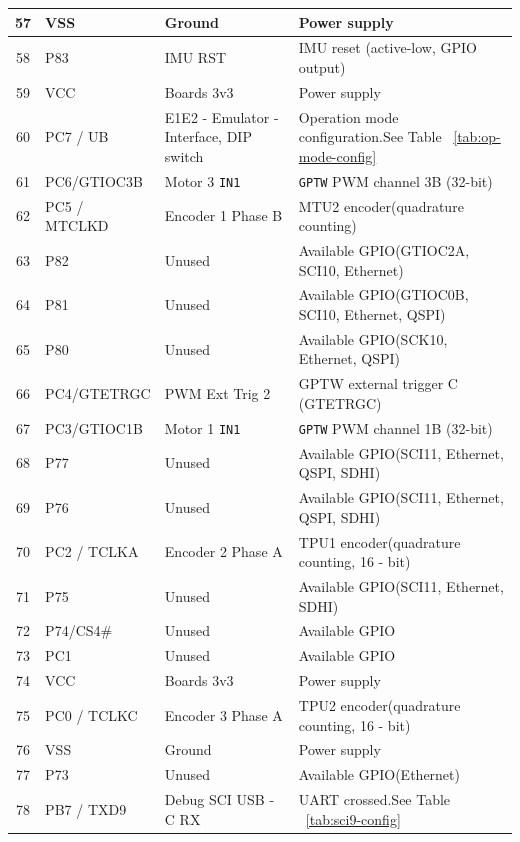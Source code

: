 \begin{longtable} { | c | l | l | p{5cm} |}
\hline
\rowcolor{gray!15}
57 & VSS & Ground &Power supply \\
\hline
\rowcolor{lime!10}
58 & P83 & IMU RST & IMU reset (active-low, GPIO output) \\
\hline
\rowcolor{gray!15}
59 & VCC &Boards 3v3 & Power supply \\
\hline
\rowcolor{yellow!15}
60 & PC7 / UB &E1E2 - Emulator - Interface,
    DIP switch &Operation mode configuration.See Table ~\ref{tab:op-mode-config}
\\
\hline
\rowcolor{blue!20}
61 & PC6/GTIOC3B & Motor 3 \texttt{IN1} & \texttt{GPTW} PWM channel 3B (32-bit) \\
\hline
\rowcolor{green!20}
62 & PC5 / MTCLKD &Encoder 1 Phase B &MTU2 encoder(quadrature counting) \\
\hline
63 & P82 & Unused &Available GPIO(GTIOC2A, SCI10, Ethernet) \\
\hline
64 & P81 & Unused &Available GPIO(GTIOC0B, SCI10, Ethernet, QSPI) \\
\hline
65 & P80 & Unused &Available GPIO(SCK10, Ethernet, QSPI) \\
\hline
\rowcolor{lime!10}
66 & PC4/GTETRGC & PWM Ext Trig 2 & GPTW external trigger C (GTETRGC) \\
\hline
\rowcolor{blue!20}
67 & PC3/GTIOC1B & Motor 1 \texttt{IN1} & \texttt{GPTW} PWM channel 1B (32-bit) \\
\hline
68 & P77 & Unused &Available GPIO(SCI11, Ethernet, QSPI, SDHI) \\
\hline
69 & P76 & Unused &Available GPIO(SCI11, Ethernet, QSPI, SDHI) \\
\hline
\rowcolor{green!20}
70 & PC2 / TCLKA &Encoder 2 Phase A &TPU1 encoder(quadrature counting, 16 - bit) \\
\hline
71 & P75 & Unused &Available GPIO(SCI11, Ethernet, SDHI) \\
\hline
72 & P74/CS4\# & Unused & Available GPIO \\
\hline
73 & PC1 & Unused & Available GPIO \\
\hline
\rowcolor{gray!15}
74 & VCC &Boards 3v3 & Power supply \\
\hline
\rowcolor{green!20}
75 & PC0 / TCLKC &Encoder 3 Phase A &TPU2 encoder(quadrature counting, 16 - bit) \\
\hline
\rowcolor{gray!15}
76 & VSS & Ground &Power supply \\
\hline
77 & P73 & Unused &Available GPIO(Ethernet) \\
\hline
\rowcolor{yellow!15}
78 & PB7 / TXD9 &Debug SCI USB - C RX &UART crossed.See Table ~\ref{tab:sci9-config}

\end{longtable}
